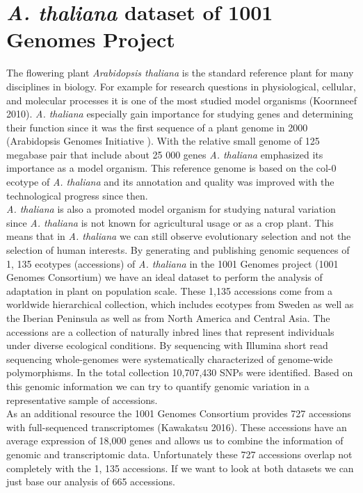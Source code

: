 \section{\textit{A. thaliana} dataset of 1001 Genomes Project}
The flowering plant \textit{Arabidopsis thaliana} is the standard reference plant for many disciplines in biology. For example for research questions in physiological, cellular, and molecular processes it is one of the most studied model organisms (Koornneef 2010\cite{Koornneef2010}). \textit{A. thaliana} especially gain importance for studying genes and determining their function since it was the first sequence of a plant genome in 2000 (Arabidopsis Genomes Initiative \cite{AGI2000}). With the relative small genome of 125 megabase pair that include about 25 000 genes \textit{A. thaliana} emphasized its importance as a model organism. This reference genome is based on the col-0 ecotype of \textit{A. thaliana} and its annotation and quality was improved with the technological progress since then.\\
\textit{A. thaliana} is also a promoted model organism for studying natural variation since \textit{A. thaliana} is not known for agricultural usage or as a crop plant. This means that in \textit{A. thaliana} we can still observe evolutionary selection and not the selection of human interests\cite{Koornneef2010}. By generating and publishing genomic sequences of 1, 135 ecotypes (accessions) of \textit{A. thaliana} in the 1001 Genomes project (1001 Genomes Consortium\cite{1001Genomes2016})  we have an ideal dataset to perform the analysis of adaptation in plant on population scale. These 1,135 accessions come from a worldwide hierarchical collection, which includes ecotypes from Sweden as well as the Iberian Peninsula as well as from North America and Central Asia. The accessions are a collection of naturally inbred lines that represent individuals under diverse ecological conditions. By sequencing with Illumina short read sequencing whole-genomes were systematically characterized of genome-wide polymorphisms. In the total collection 10,707,430 SNPs were identified. Based on this genomic information we can try to quantify genomic variation in a representative sample of accessions.\\
As an additional resource the 1001 Genomes Consortium provides 727 accessions with full-sequenced transcriptomes (Kawakatsu 2016\cite{Kawakatsu2016}). These accessions have an average expression of 18,000 genes and allows us to combine the information of genomic and transcriptomic data. Unfortunately these 727 accessions overlap not completely with the 1, 135 accessions. If we want to look at both datasets we can just base our analysis of 665 accessions. 
